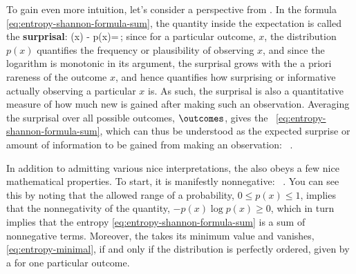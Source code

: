 To gain even more intuition, let's consider a perspective from .
In the  formula \eqref{eq:entropy-shannon-formula-sum}, the quantity inside the expectation
is called the \textbf{surprisal}: 
\be\label{eq:surprisal-def}
\surprise(x) \equiv - \log p(x)=\log\!\le[\frac{1}{p(x)}\ri] \,;
\ee
since for a particular outcome, $x$, the distribution $p(x)$ quantifies the frequency or plausibility of observing $x$, and since the logarithm is monotonic in its argument, the surprisal
grows with the a priori rareness of the outcome $x$, and hence quantifies how surprising or informative actually observing a particular $x$ is.
As such, the  surprisal is also a quantitative measure of how much new  is gained after making such an observation. 
Averaging the surprisal over all possible outcomes, $\outcomes$, gives the ~\eqref{eq:entropy-shannon-formula-sum}, which can thus be understood as the expected surprise or amount of information to be gained from making an observation: 
\be\label{eq:entropy-as-expectation-of-surprisal}
\entropy\!\le[p(x)\ri] \equiv {}\, .
\ee




In addition to admitting various nice interpretations, the  also obeys a few nice mathematical properties.
To start, it is manifestly nonnegative:
\be\label{eq:entropy-positivity}
\entropy\!\le[p(x)\ri]
\, .
\ee
You can see this by noting that the allowed range of a probability, $0 \leq p(x) \leq 1$, implies that the nonnegativity of the quantity, $-p(x)\log p(x) \geq 0$, which in turn implies that the entropy \eqref{eq:entropy-shannon-formula-sum} is a sum of nonnegative terms. Moreover, the  takes its minimum value and vanishes, \eqref{eq:entropy-minimal}, if and only if the distribution is perfectly ordered, given by a  for one particular outcome.

